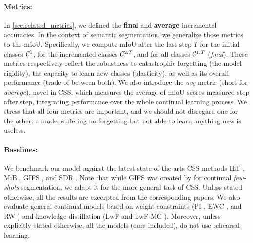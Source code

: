 \paragraph{Metrics:} In \autoref{sec:related_metrics}, we defined the \textbf{final} and
\textbf{average} incremental accuracies. In the context of semantic segmentation, we generalize
those metrics to the \acf{mIoU}. Specifically, we compute \ac{mIoU} after the last step $T$ for the
initial classes $\mathcal{C}^{1}$, for the incremented classes $\mathcal{C}^{2:T}$, and for all classes
$\mathcal{C}^{1:T}$ (\textit{final}). These metrics respectively reflect the robustness to catastrophic
forgetting (the model rigidity), the capacity to learn new classes (plasticity), as well as its
overall performance (trade-of between both). We also introduce the \textit{avg} metric (short for
\textit{average}), novel in \ac{CSS}, which measures the average of \ac{mIoU} scores measured step
after step, integrating performance over the whole continual learning process. We stress that all
four metrics are important, and we should not disregard one for the other: a model suffering no
forgetting but not able to learn anything new is useless.



\paragraph{Baselines:} We benchmark our model against the latest state-of-the-arts \ac{CSS}
methods ILT \citep{michieli2019ilt}, MiB \citep{cermelli2020modelingthebackground}, GIFS
\citep{cermelli2020fewshotcontinualsegm}, and SDR \citep{michieli2021sdr}. Note that while GIFS was
created by \cite{cermelli2020fewshotcontinualsegm} for continual \textit{few-shots}
segmentation, we adapt it for the more general task of \ac{CSS}. Unless stated otherwise, all the results
are excerpted from the corresponding papers. We also evaluate general continual models based on
weight constraints (PI \citep{zenke2017synaptic_intelligence}, EWC \citep{kirkpatrick2017ewc}, and RW
\citep{chaudhry2018riemannien_walk}) and knowledge distillation (LwF \citep{li2018lwf} and LwF-MC
\citep{rebuffi2017icarl}). Moreover, unless explicitly stated otherwise, all the models (ours
included), do not use rehearsal learning.


